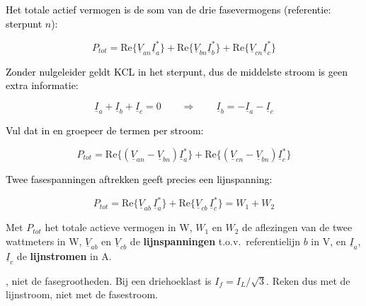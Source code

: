 \documentclass[a4paper,11pt]{article}
\newcommand{\stapreden}[1]{\par\vspace{1.4mm}\noindent\textcolor{black}{#1}\par\vspace{-2mm}}
\begin{document}
\stapreden{Het totale actief vermogen is de som van de drie fasevermogens (referentie: sterpunt $n$):}
\[P_{tot} = \text{Re}\{\underline{V}_{an}\underline{I}_a^{*}\}
    + \text{Re}\{\underline{V}_{bn}\underline{I}_b^{*}\}
    + \text{Re}\{\underline{V}_{cn}\underline{I}_c^{*}\}\]

\stapreden{Zonder nulgeleider geldt KCL in het sterpunt, dus de middelste stroom is geen extra informatie:}
\[\underline{I}_a + \underline{I}_b + \underline{I}_c = 0
    \qquad\Longrightarrow\qquad
    \underline{I}_b = -\underline{I}_a - \underline{I}_c\]

\stapreden{Vul dat in en groepeer de termen per stroom:}
\[P_{tot} = \text{Re}\{(\underline{V}_{an} - \underline{V}_{bn})\underline{I}_a^{*}\}
    + \text{Re}\{(\underline{V}_{cn} - \underline{V}_{bn})\underline{I}_c^{*}\}\]

\stapreden{Twee fasespanningen aftrekken geeft precies een lijnspanning:}
\[P_{tot} = \text{Re}\{\underline{V}_{ab}\,\underline{I}_a^{*}\}
    + \text{Re}\{\underline{V}_{cb}\,\underline{I}_c^{*}\}
    = \boxed{W_1 + W_2}\]

{Met $P_{tot}$ het totale actieve vermogen in W, $W_1$ en $W_2$ de aflezingen van de twee wattmeters
    in W, $\underline{V}_{ab}$ en $\underline{V}_{cb}$ de \textbf{lijnspanningen} t.o.v.\ referentielijn
    $b$ in V, en $\underline{I}_a$, $\underline{I}_c$ de \textbf{lijnstromen} in A.}

, niet de fasegrootheden. Bij een
driehoeklast is $I_f = I_L/\sqrt{3}$. Reken dus met de lijnstroom, niet met de fasestroom.
\end{document}

